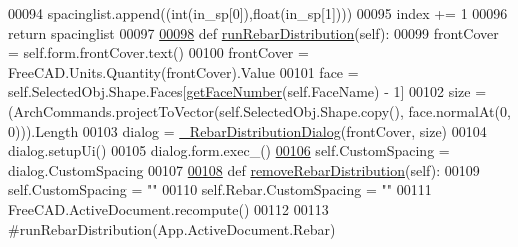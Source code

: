 \begin{DoxyCode}
00094         spacinglist.append((int(in\_sp[0]),float(in\_sp[1])))
00095         index += 1
00096     \textcolor{keywordflow}{return} spacinglist
00097 
\hypertarget{RebarDistribution_8py_source.tex_l00098}{}\hyperlink{namespaceRebarDistribution_aa547df5cb10d2e64eaa0b51c445fa30b}{00098} \textcolor{keyword}{def }\hyperlink{namespaceRebarDistribution_aa547df5cb10d2e64eaa0b51c445fa30b}{runRebarDistribution}(self):
00099     frontCover = self.form.frontCover.text()
00100     frontCover = FreeCAD.Units.Quantity(frontCover).Value
00101     face = self.SelectedObj.Shape.Faces[\hyperlink{namespaceRebarfunc_a3885b3b63e3a41508ac79bc7550cf301}{getFaceNumber}(self.FaceName) - 1]
00102     size = (ArchCommands.projectToVector(self.SelectedObj.Shape.copy(), face.normalAt(0, 0))).Length
00103     dialog = \hyperlink{classRebarDistribution_1_1__RebarDistributionDialog}{\_RebarDistributionDialog}(frontCover, size)
00104     dialog.setupUi()
00105     dialog.form.exec\_()
\hypertarget{RebarDistribution_8py_source.tex_l00106}{}\hyperlink{namespaceRebarDistribution_a6572ac63b9c553f99eeb53e19f7b4e7c}{00106}     self.CustomSpacing = dialog.CustomSpacing
00107 
\hypertarget{RebarDistribution_8py_source.tex_l00108}{}\hyperlink{namespaceRebarDistribution_a85270a1b6e8c782a9e0ba54add518f2a}{00108} \textcolor{keyword}{def }\hyperlink{namespaceRebarDistribution_a85270a1b6e8c782a9e0ba54add518f2a}{removeRebarDistribution}(self):
00109     self.CustomSpacing = \textcolor{stringliteral}{""}
00110     self.Rebar.CustomSpacing = \textcolor{stringliteral}{""}
00111     FreeCAD.ActiveDocument.recompute()
00112 
00113 \textcolor{comment}{#runRebarDistribution(App.ActiveDocument.Rebar)}
\end{DoxyCode}
